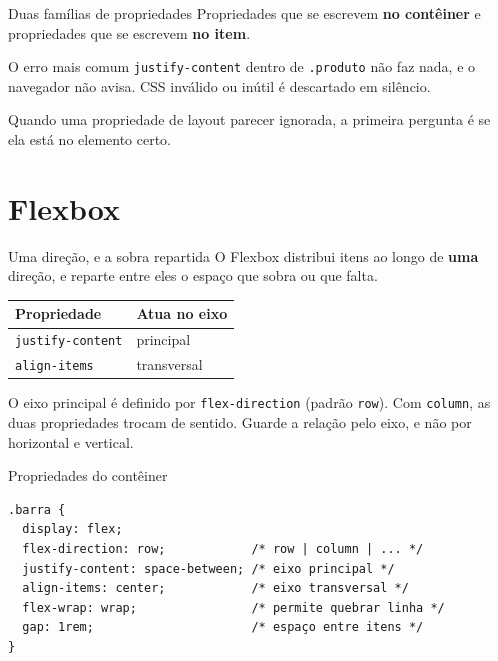 \documentclass{beamer}
\begin{document}
\begin{frame}{Duas famílias de propriedades}
	Propriedades que se escrevem \textbf{no contêiner} e propriedades que se
	escrevem \textbf{no item}.

	\vspace{0.4cm}
	\begin{block}{O erro mais comum}
		\texttt{justify-content} dentro de \texttt{.produto} não faz nada, e o
		navegador não avisa. CSS inválido ou inútil é descartado em silêncio.
	\end{block}

	\vspace{0.4cm}
	Quando uma propriedade de layout parecer ignorada, a primeira pergunta é se
	ela está no elemento certo.
\end{frame}

\section{Flexbox}

\begin{frame}{Uma direção, e a sobra repartida}
	O Flexbox distribui itens ao longo de \textbf{uma} direção, e reparte entre
	eles o espaço que sobra ou que falta.

	\vspace{0.5cm}
	\begin{center}
		\begin{tabular}{ll}
			\toprule
			\textbf{Propriedade}        & \textbf{Atua no eixo} \\
			\midrule
			\texttt{justify-content}    & principal             \\
			\texttt{align-items}        & transversal           \\
			\bottomrule
		\end{tabular}
	\end{center}

	\vspace{0.4cm}
	O eixo principal é definido por \texttt{flex-direction} (padrão
	\texttt{row}). Com \texttt{column}, as duas propriedades trocam de sentido.
	Guarde a relação pelo eixo, e não por horizontal e vertical.
\end{frame}

\begin{frame}[fragile]{Propriedades do contêiner}
	\begin{verbatim}
.barra {
  display: flex;
  flex-direction: row;            /* row | column | ... */
  justify-content: space-between; /* eixo principal */
  align-items: center;            /* eixo transversal */
  flex-wrap: wrap;                /* permite quebrar linha */
  gap: 1rem;                      /* espaço entre itens */
}
  \end{verbatim}
\end{frame}
\end{document}
